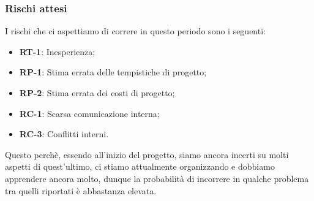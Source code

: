 \subsubsection{Rischi attesi}
I rischi che ci aspettiamo di correre in questo periodo sono i seguenti: 
\begin{itemize}
\setlength{\itemsep}{0}
\item \textbf{RT-1}: Inesperienza;
\item \textbf{RP-1}: Stima errata delle tempistiche di progetto;
\item \textbf{RP-2}: Stima errata dei costi di progetto;
\item \textbf{RC-1}: Scarsa comunicazione interna;
\item \textbf{RC-3}: Conflitti interni.
\end{itemize}
Questo perchè, essendo all’inizio del progetto, siamo ancora incerti su molti aspetti di
quest’ultimo, ci stiamo attualmente organizzando e dobbiamo apprendere ancora molto, dunque la
probabilità di incorrere in qualche problema tra quelli riportati è abbastanza elevata.
\newpage
